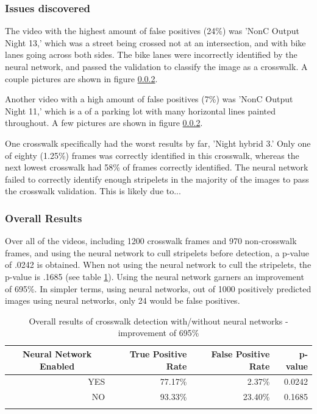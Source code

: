 \documentclass[12pt]{ucthesis}
\begin{document}
\subsubsection{Issues discovered}

The video with the highest amount of false positives (24\%) was 'NonC Output Night 13,' which was a street being crossed not at an intersection, and with bike lanes going across both sides. The bike lanes were incorrectly identified by the neural network, and passed the validation to classify the image as a crosswalk. A couple pictures are shown in figure \ref{}.

Another video with a high amount of false positives (7\%) was 'NonC Output Night 11,' which is a of a parking lot with many horizontal lines painted throughout.  A few pictures are shown in figure \ref{}.

One crosswalk specifically had the worst results by far, 'Night hybrid 3.' Only one of eighty (1.25\%) frames was correctly identified in this crosswalk, whereas the next lowest crosswalk had 58\% of frames correctly identified. The neural network failed to correctly identify enough stripelets in the majority of the images to pass the crosswalk validation. This is likely due to...

\subsubsection{Overall Results}
    
Over all of the videos, including 1200 crosswalk frames and 970 non-crosswalk frames, and using the neural network to cull stripelets before detection, a p-value of .0242 is obtained. When not using the neural network to cull the stripelets, the p-value is .1685 (see table \ref{tab:overallresults}). Using the neural network garners an improvement of 695\%. In simpler terms, using neural networks, out of 1000 positively predicted images using neural networks, only 24 would be false positives. 

\begin{center}
    \begin{longtable}{| r | r | r | r |}
    \hline
    \multicolumn{1}{|c|}{Neural Network Enabled} & True Positive Rate & False Positive Rate & p-value \bigstrut\\
    \hline
    YES & 77.17\% & 2.37\% & 0.0242 \bigstrut\\
    \hline
    NO & 93.33\% & 23.40\% & 0.1685 \bigstrut\\
    \hline

    \caption{Overall results of crosswalk detection with/without neural networks -  improvement of 695\%}
    \label{tab:overallresults} 
    \end{longtable}
\end{center}
\end{document}
